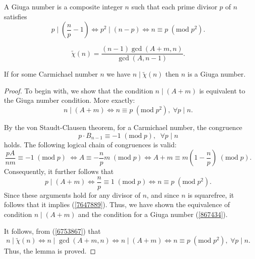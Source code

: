 \documentclass[10pt,a4paper]{amsart}
\begin{document}
\begin{definition}
A Giuga number is a composite integer $n$ such that each prime divisor $p$ of $n$ satisfies 
\begin{equation}
p\mid \left(\frac{n}{p}-1\right) \Leftrightarrow p^2\mid (n-p) \Leftrightarrow n\equiv p\; (\mathrm{mod}\; p^2).
\label{867434}
\end{equation}
\end{definition}

\begin{equation}
\tilde{\chi}(n)=\frac{\left(n-1\right)\gcd(A+m, n)}{\gcd(A, n-1)}.
\label{6753867}
\end{equation}

\begin{lemma}
If for some Carmichael number $n$ we have  $n \mid \tilde{\chi}(n)$ then $n$ is a Giuga number.  
\end{lemma}

\begin{proof}
To begin with, we show that the condition $n\mid \left(A+m\right)$ is equivalent to the Giuga number condition. More exactly: 
\begin{equation}
n\mid \left(A+m\right) \Leftrightarrow n \equiv p\; \left(\mathrm{mod}\; p^2\right),\; \forall p\mid n.
\label{7647889}
\end{equation}

By the von Staudt-Clausen theorem, for a Carmichael number, the congruence 
\[
p\cdot B_{n-1}\equiv -1\; (\mathrm{mod}\; p),\;\; \forall p\mid n
\] 
holds.   The following logical chain of congruences is valid:
\[
\frac{p A}{nm}\equiv -1\; (\mathrm{mod}\; p)\; \Leftrightarrow A \equiv -\frac{n}{p}m\; (\mathrm{mod}\; p) \Leftrightarrow 
A+m \equiv m\left(1-\frac{n}{p}\right)\; (\mathrm{mod}\; p).
\]
Consequently, it further follows that 
\[
p\mid \left(A+m\right) \Leftrightarrow \frac{n}{p} \equiv 1 \; (\mathrm{mod}\; p) \Leftrightarrow n \equiv p \; (\mathrm{mod}\; p^2).
\]
Since these arguments hold for any divisor of $n$, and since $n$ is squarefree, it follows that it implies (\ref{7647889}). Thus, we have shown the equivalence of condition $n\mid \left(A+m\right)$ and the condition for a Giuga number (\ref{867434}). 

It follows, from (\ref{6753867}) that 
\[
n\mid \tilde{\chi}(n) \Leftrightarrow n\mid \gcd (A+m, n) \Leftrightarrow n\mid \left(A+m\right) \Leftrightarrow n \equiv p\; \left(\mathrm{mod}\; p^2\right),\; \forall p\mid n.
\]
Thus, the lemma is proved.
\end{proof}
\end{document}

